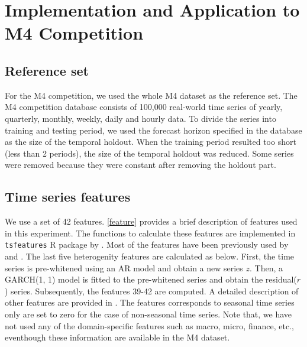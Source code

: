 \documentclass[11pt,a4paper,]{article}
\theoremstyle{definition}
\theoremstyle{definition}
\theoremstyle{definition}
\theoremstyle{remark}
\begin{document}
\section{Implementation and Application to M4
Competition}\label{M4application}

\subsection{Reference set}\label{reference-set}

For the M4 competition, we used the whole M4 dataset as the reference
set. The M4 competition database consists of 100,000 real-world time
series of yearly, quarterly, monthly, weekly, daily and hourly data. To
divide the series into training and testing period, we used the forecast
horizon specified in the database as the size of the temporal holdout.
When the training period resulted too short (less than 2 periods), the
size of the temporal holdout was reduced. Some series were removed
because they were constant after removing the holdout part.

\subsection{Time series features}\label{time-series-features}

We use a set of 42 features. \autoref{feature} provides a brief
description of features used in this experiment. The functions to
calculate these features are implemented in \texttt{tsfeatures} R
package by \textcite{tsfeatures}. Most of the features have been
previously used by \textcite{hyndman2015large} and \textcite{fforms}.
The last five heterogenity features are calculated as below. First, the
time series is pre-whitened using an AR model and obtain a new series
\(z\). Then, a GARCH(1, 1) model is fitted to the pre-whitened series
and obtain the residual(\(r\)) series. Subsequently, the features 39-42
are computed. A detailed description of other features are provided in
\textcite{fforms}. The features corresponds to seasonal time series only
are set to zero for the case of non-seasonal time series. Note that, we
have not used any of the domain-specific features such as macro, micro,
finance, etc., eventhough these information are available in the M4
dataset.
\end{document}

